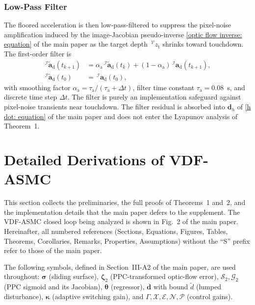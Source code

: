 \documentclass[10pt,journal]{IEEEtran}
\begin{document}
\subsubsection{Low-Pass Filter}
\label{sup:lpf}
The floored acceleration is then low-pass-filtered to suppress the pixel-noise amplification induced by the image-Jacobian pseudo-inverse \eqref{optic flow inverse: equation} of the main paper as the target depth $\,^\mathcal{V}z_\text{t}$ shrinks toward touchdown. The first-order filter is
\begin{align} \label{sup:lpf eq}
    \,^\mathcal{I}\!\tilde{\boldsymbol{a}}_\text{d}(t_{k+1}) &= \alpha_\text{a}\,^\mathcal{I}\!\tilde{\boldsymbol{a}}_\text{d}(t_k)+(1-\alpha_\text{a})\,^\mathcal{I}\!\boldsymbol{a}_\text{d}(t_{k+1}), \nonumber\\
    \,^\mathcal{I}\!\tilde{\boldsymbol{a}}_\text{d}(t_0) &= \,^\mathcal{I}\!\boldsymbol{a}_\text{d}(t_0),
\end{align}
with smoothing factor $\alpha_\text{a}=\tau_\text{a}/(\tau_\text{a}+\Delta t)$, filter time constant $\tau_\text{a}=0.08$~s, and discrete time step $\Delta t$. The filter is purely an implementation safeguard against pixel-noise transients near touchdown. The filter residual is absorbed into $\boldsymbol{d}_h$ of \eqref{h dot: equation} of the main paper and does not enter the Lyapunov analysis of Theorem~1.


\section{Detailed Derivations of VDF-ASMC}
\label{sup:detailed}
This section collects the preliminaries, the full proofs of Theorems~1 and~2, and the implementation details that the main paper defers to the supplement. The VDF-ASMC closed loop being analyzed is shown in Fig.~2 of the main paper. Hereinafter, all numbered references (Sections, Equations, Figures, Tables, Theorems, Corollaries, Remarks, Properties, Assumptions) without the ``S'' prefix refer to those of the main paper.

The following symbols, defined in Section~III-A2 of the main paper, are used throughout: $\boldsymbol{\sigma}$ (sliding surface), $\boldsymbol{\zeta}_2$ (PPC-transformed optic-flow error), $\mathcal{S}_2,\mathcal{G}_2$ (PPC sigmoid and its Jacobian), $\boldsymbol{\theta}$ (regressor), $\boldsymbol{\overline{d}}$ with bound $\tilde{d}$ (lumped disturbance), $\boldsymbol{\kappa}$ (adaptive switching gain), and $\Gamma,\mathcal{X},\mathcal{E},\mathcal{N},\mathcal{P}$ (control gains).
\end{document}

